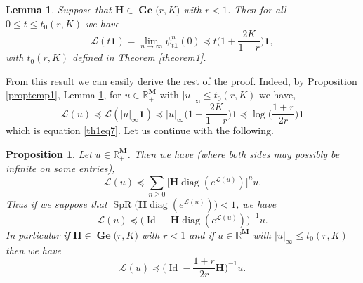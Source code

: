 \documentclass[reqno,final,11pt]{amsart}
\theoremstyle{plain}
\newtheorem{proposition}[theorem]{Proposition}
\newtheorem{lemma}[theorem]{Lemma}
\theoremstyle{definition}
\theoremstyle{remark}
\newcommand{\R}{\mathds{R}}
\newcommand{\M}{\bm{M}}
\newcommand{\Ge}[2]{\bm{\Gel(} #1,#2 \bm{)} }
\renewcommand{\L}{\bm{\mathscr{L}}}
\newcommand{\ones}{\bm{1}}
\renewcommand{\H}{\bm{H}}
\newcommand{\pos}{\R_+^{\M}}
\DeclareMathOperator{\diag}{diag}
\DeclareMathOperator{\spr}{SpR}
\DeclareMathOperator{\Gel}{Ge}
\DeclareMathOperator{\Id}{Id}
\begin{document}
\begin{lemma}\label{lemma1}
    Suppose that $\H\in\Ge{r}{K}$ with $r<1$. Then for all $0\leq t\leq t_0(r,K)$ we have
    \begin{equation}
    	\L(t\ones) = \lim\limits_{n\to\infty} \psi^n_{t\ones}(0) \preceq t \big( 1+ \frac{2K}{1-r} \big) \ones,
    \end{equation} 
    with $t_0(r,K)$ defined in Theorem \ref{theorem1}.
\end{lemma}

From this result we can easily derive the rest of the proof. Indeed, by Proposition \ref{proptemp1}, Lemma \ref{lemma1}, for $u\in\pos$ with $\vert u\vert_{\infty} \leq t_0(r,K)$ we have,
\begin{equation}\label{demth1eq16}
    \L(u) \preceq \L(\vert u\vert_{\infty}\ones) \preceq \vert u\vert_{\infty} \big( 1+ \frac{2K}{1-r} \big) \ones \preceq \log\big(\frac{1+r}{2r}\big) \ones
\end{equation}
which is equation \eqref{th1eq7}. Let us continue with the following.

\begin{proposition}\label{proposition2}
    Let $u\in\pos$. Then we have (where both sides may possibly be infinite on some entries),
    \begin{equation}
        \L(u) \preceq \sum_{n\geq 0} \big[ \H\diag(e^{\L(u)}) \big]^n u.
    \end{equation}
    Thus if we suppose that $\spr\big(\H\diag(e^{\L(u)})\big)<1$, we have
    \begin{equation}
        \L(u) \preceq \big(\Id - \H \diag(e^{\L(u)}) \big)^{-1} u.
    \end{equation}
    In particular if $\H\in\Ge{r}{K}$ with $r<1$ and if $u\in\pos$ with $ \vert u\vert_{\infty} \leq t_0(r,K)$ then we have
    \begin{equation}
         \L(u)  \preceq  \big(\Id - \frac{1+r}{2r} \H\big)^{-1} u.
    \end{equation}
\end{proposition}
\end{document}
